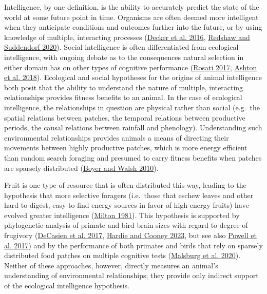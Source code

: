 \documentclass[twoside,12pt,final]{ucthesis-CA2012}
\begin{document}
\begin{ucmainmatter}
Intelligence, by one definition, is the ability to accurately predict the state of the world at some future point in time. Organisms are often deemed more intelligent when they anticipate conditions and outcomes further into the future, or by using knowledge of multiple, interacting processes (\protect\hyperlink{ref-decker2016}{Decker et al. 2016}, \protect\hyperlink{ref-redshaw2020}{Redshaw and Suddendorf 2020}). Social intelligence is often differentiated from ecological intelligence, with ongoing debate as to the consequences natural selection in either domain has on other types of cognitive performance (\protect\hyperlink{ref-rosati2017}{Rosati 2017}, \protect\hyperlink{ref-ashton2018}{Ashton et al. 2018}). Ecological and social hypotheses for the origins of animal intelligence both posit that the ability to understand the nature of multiple, interacting relationships provides fitness benefits to an animal. In the case of ecological intelligence, the relationships in question are physical rather than social (e.g.~the spatial relations between patches, the temporal relations between productive periods, the causal relations between rainfall and phenology). Understanding such environmental relationships provides animals a means of directing their movements between highly productive patches, which is more energy efficient than random search foraging and presumed to carry fitness benefits when patches are sparsely distributed (\protect\hyperlink{ref-boyer2010}{Boyer and Walsh 2010}).

Fruit is one type of resource that is often distributed this way, leading to the hypothesis that more selective foragers (i.e.~those that eschew leaves and other hard-to-digest, easy-to-find energy sources in favor of high-energy fruits) have evolved greater intelligence (\protect\hyperlink{ref-milton1981}{Milton 1981}). This hypothesis is supported by phylogenetic analysis of primate and bird brain sizes with regard to degree of frugivory (\protect\hyperlink{ref-decasien2017}{DeCasien et al. 2017}, \protect\hyperlink{ref-hardie2023}{Hardie and Cooney 2023}, but see also \protect\hyperlink{ref-powell2017a}{Powell et al. 2017}) and by the performance of both primates and birds that rely on sparsely distributed food patches on multiple cognitive tests (\protect\hyperlink{ref-malsburg2020}{Malsburg et al. 2020}). Neither of these approaches, however, directly measures an animal's understanding of environmental relationships; they provide only indirect support of the ecological intelligence hypothesis.


\end{ucmainmatter}
\end{document}
